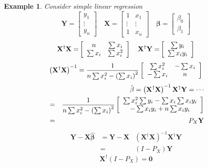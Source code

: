 \documentclass{article}
\newtheorem{example}[theorem]{Example}
\begin{document}
\begin{example}
Consider simple linear regression%
\begin{equation*}
\mathbf{Y=}\left[ 
\begin{array}{c}
y_{1} \\ 
\vdots \\ 
y_{n}%
\end{array}%
\right] \quad \mathbf{X=}\left[ 
\begin{array}{cc}
1 & x_{1} \\ 
\vdots & \vdots \\ 
1 & x_{n}%
\end{array}%
\right] \quad \mathbf{\beta =}\left[ 
\begin{array}{c}
\beta _{0} \\ 
\beta _{1}%
\end{array}%
\right]
\end{equation*}%
\begin{equation*}
\mathbf{X}^{\dagger }\mathbf{X=}\left[ 
\begin{array}{cc}
n & \tsum x_{i} \\ 
\tsum x_{i} & \tsum x_{i}^{2}%
\end{array}%
\right] \quad \mathbf{X}^{\dagger }\mathbf{Y=}\left[ 
\begin{array}{c}
\tsum y_{i} \\ 
\tsum x_{i}y_{i}%
\end{array}%
\right]
\end{equation*}%
\begin{equation*}
\left( \mathbf{X}^{\dagger }\mathbf{X}\right) ^{-1}=\frac{1}{n\tsum
x_{i}^{2}-\left( \tsum x_{i}\right) ^{2}}\left[ 
\begin{array}{cc}
\tsum x_{i}^{2} & -\tsum x_{i} \\ 
-\tsum x_{i} & n%
\end{array}%
\right]
\end{equation*}%
\begin{eqnarray*}
&\therefore &\hat{\beta}=\left( \mathbf{X}^{\dagger }\mathbf{X}\right) ^{-1}%
\mathbf{X}^{\dagger }\mathbf{Y=\cdots } \\
&=&\frac{1}{n\tsum x_{i}^{2}-\left( \tsum x_{i}\right) ^{2}}\left[ 
\begin{array}{c}
\tsum x_{i}^{2}\tsum y_{i}-\tsum x_{i}\tsum x_{i}y_{i} \\ 
-\tsum x_{i}y_{i}+n\tsum x_{i}y_{i}%
\end{array}%
\right] \\
&=&P_{X}\mathbf{Y}
\end{eqnarray*}%
\begin{eqnarray*}
\mathbf{Y-X\hat{\beta}} &\mathbf{=Y-X}&\left( \mathbf{X}^{\dagger }\mathbf{X}%
\right) ^{-1}\mathbf{X}^{\dagger }\mathbf{Y} \\
&=&\left( I-P_{X}\right) \mathbf{Y}
\end{eqnarray*}%
\begin{equation*}
\mathbf{X}^{\dagger }\left( I-P_{X}\right) =\boldsymbol{0}
\end{equation*}
\end{example}
\end{document}
